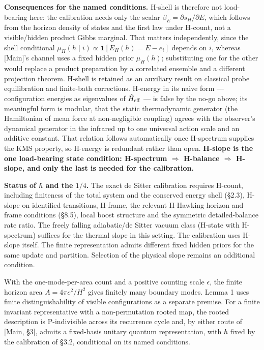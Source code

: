 \documentclass[
]{article}
\begin{document}
\textbf{Consequences for the named conditions.} H-shell is therefore not
load-bearing here: the calibration needs only the scalar
\(\beta_E=\partial s_H/\partial E\), which follows from the horizon
density of states and the first law under H-count, not a visible/hidden
product Gibbs marginal. That matters independently, since the shell
conditional \(\mu_H(h\mid i)\propto\mathbf 1[E_H(h)=E-e_i]\) depends on
\(i\), whereas {[}Main{]}'s channel uses a fixed hidden prior
\(\mu_H(h)\); substituting one for the other would replace a product
preparation by a correlated ensemble and a different projection theorem.
H-shell is retained as an auxiliary result on classical probe
equilibration and finite-bath corrections. H-energy in its naive form
--- configuration energies as eigenvalues of \(\hat H_{\rm eff}\) --- is
false by the no-go above; its meaningful form is modular, that the
static thermodynamic generator (the Hamiltonian of mean force at
non-negligible coupling) agrees with the observer's dynamical generator
in the infrared up to one universal action scale and an additive
constant. That relation follows automatically once H-spectrum supplies
the KMS property, so H-energy is redundant rather than open.
\textbf{H-slope is the one load-bearing state condition: H-spectrum
\(\Rightarrow\) H-balance \(\Rightarrow\) H-slope, and only the last is
needed for the calibration.}

\textbf{Status of \(\hbar\) and the \(1/4\).} The exact de Sitter
calibration requires H-count, including finiteness of the total system
and the conserved energy shell (§2.3), H-slope on identified
transitions, H-frame, the relevant H-Hawking horizon and frame
conditions (§8.5), local boost structure and the symmetric
detailed-balance rate ratio. The freely falling adiabatic/de Sitter
vacuum class (H-state with H-spectrum) suffices for the thermal slope in
this setting. The calibration uses H-slope itself. The finite
representation admits different fixed hidden priors for the same update
and partition. Selection of the physical slope remains an additional
condition.

With the one-mode-per-area count and a positive counting scale
\(\epsilon\), the finite horizon area \(A=4\pi c^2/H^2\) gives finitely
many boundary modes. Lemma 1 uses finite distinguishability of visible
configurations as a separate premise. For a finite invariant
representative with a non-permutation rooted map, the rooted description
is P-indivisible across its recurrence cycle and, by either route of
{[}Main, §3{]}, admits a fixed-basis unitary quantum representation,
with \(\hbar\) fixed by the calibration of §3.2, conditional on its
named conditions.
\end{document}
